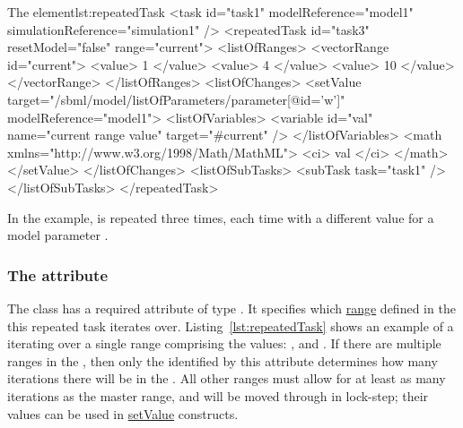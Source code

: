 



%
\begin{myXmlLst}{The  element}{lst:repeatedTask}
<task id="task1" modelReference="model1" simulationReference="simulation1" />
<repeatedTask id="task3" resetModel="false" range="current"> 
  <listOfRanges>
    <vectorRange id="current"> 
        <value> 1 </value> 
        <value> 4 </value> 
        <value> 10 </value> 
    </vectorRange> 
  </listOfRanges>
  <listOfChanges>
     <setValue target="/sbml/model/listOfParameters/parameter[@id='w']" modelReference="model1">
       <listOfVariables> 
         <variable id="val" name="current range value" target="#current" /> 
       </listOfVariables> 
       <math xmlns="http://www.w3.org/1998/Math/MathML"> 
         <ci> val </ci> 
       </math> 
     </setValue> 
  </listOfChanges>
  <listOfSubTasks>
    <subTask task="task1" />
  </listOfSubTasks>
</repeatedTask>

\end{myXmlLst}
%
In the example,  is repeated three times, each time with a different value for a model parameter . 


\subsubsection{The  attribute}
\label{sec:rangeAttribute}
The  class has a required attribute  of type .
It specifies which \hyperref[class:range]{range} defined in the  this repeated task iterates over.
Listing~\ref{lst:repeatedTask} shows an example of a  iterating over a single range comprising the values: ,  and .
If there are multiple ranges in the , then only the  identified by this attribute determines how many iterations there will be in the .
All other ranges must allow for at least as many iterations as the master range, and will be moved through in lock-step; their values can be used in \hyperref[class:setValue]{setValue} constructs.


